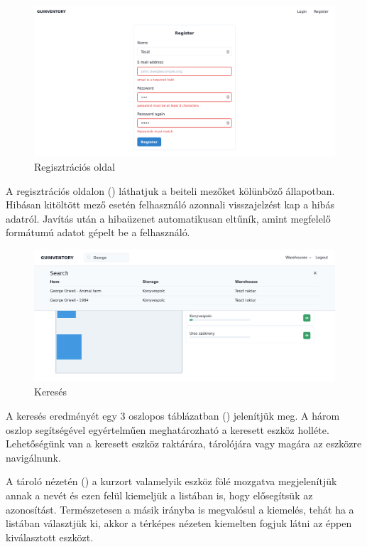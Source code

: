 \begin{figure}[!ht]
  \centering
  \includegraphics[width=150mm, keepaspectratio]{figures/reg.png}
  \caption{Regisztrációs oldal}
  \label{fig:reg}
\end{figure}

A regisztrációs oldalon () láthatjuk a beiteli mezőket kölünböző állapotban.
Hibásan kitöltött mező esetén felhasználó azonnali visszajelzést kap a hibás adatról.
Javítás után a hibaüzenet automatikusan eltűník, amint megfelelő formátumú adatot gépelt be a felhasználó.

\begin{figure}[!ht]
  \centering
  \includegraphics[width=150mm, keepaspectratio]{figures/search.png}
  \caption{Keresés}
  \label{fig:search}
\end{figure}

A keresés eredményét egy 3 oszlopos táblázatban () jelenítjük meg.
A három oszlop segítségével egyértelműen meghatározható a keresett eszköz holléte.
Lehetőségünk van a keresett eszköz raktárára, tárolójára vagy magára az eszközre navigálnunk.

A tároló nézetén () a kurzort valamelyik eszköz fölé mozgatva megjelenítjük annak a nevét és ezen felül kiemeljük a listában is, hogy elősegítsük az azonosítást.
Természetesen a másik irányba is megvalósul a kiemelés, tehát ha a listában választjük ki, akkor a térképes nézeten kiemelten fogjuk látni az éppen kiválasztott eszközt.

